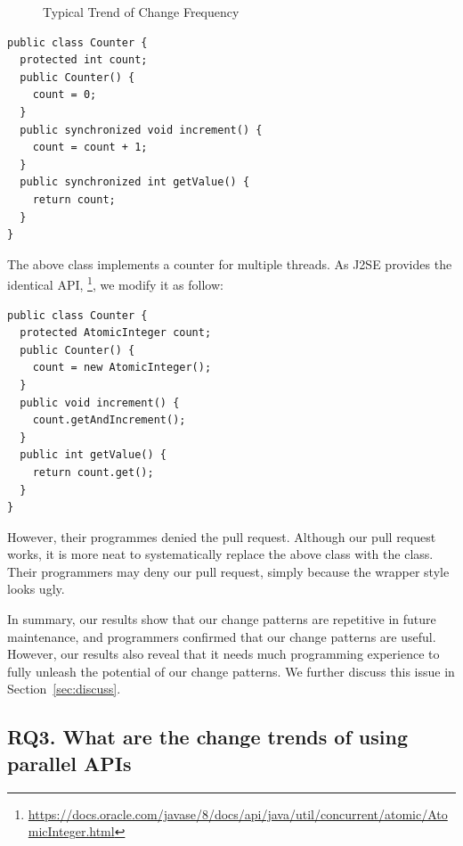 \begin{figure}
	\caption{Typical Trend of Change Frequency}
	\label{figure:trend}
\end{figure}

\begin{lstlisting}
public class Counter {
  protected int count;
  public Counter() {
    count = 0;
  }
  public synchronized void increment() {
    count = count + 1;
  }
  public synchronized int getValue() {
    return count;
  }
}
\end{lstlisting}

The above class implements a counter for multiple threads. As J2SE provides the identical API, \footnote{\url{https://docs.oracle.com/javase/8/docs/api/java/util/concurrent/atomic/AtomicInteger.html}}, we modify it as follow:

\begin{lstlisting}
public class Counter {
  protected AtomicInteger count;
  public Counter() {
    count = new AtomicInteger();
  }
  public void increment() {
    count.getAndIncrement();
  }
  public int getValue() {
    return count.get();
  }
}
\end{lstlisting}

However, their programmes denied the pull request. Although our pull request works, it is more neat to systematically replace the above  class with the  class. Their programmers may deny our pull request, simply because the wrapper style looks ugly.

In summary, our results show that our change patterns are repetitive in future maintenance, and programmers confirmed that our change patterns are useful. However, our results also reveal that it needs much programming experience to fully unleash the potential of our change patterns. We further discuss this issue in Section~\ref{sec:discuss}.

\subsection{RQ3. What are the change trends of using parallel APIs}
\label{sec:result:trend}


